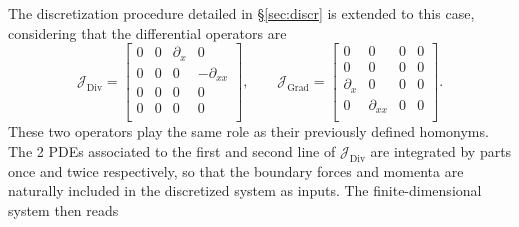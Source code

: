 \documentclass{svjour3}                     %
\newcommand{\secref}[1]{\S\ref{#1}}
\DeclareMathOperator*{\Grad}{Grad}
\DeclareMathOperator*{\Div}{Div}
\begin{document}
	The discretization procedure detailed in \secref{sec:discr} is extended to this case, considering that the differential operators are 
	\[
	\bm{\mathcal{J}}_{\Div} = \begin{bmatrix}
	0 & 0 & \partial_x & 0 \\
	0 & 0 & 0 & -\partial_{xx} \\
	0 & 0 & 0 & 0 \\
	0 & 0 & 0 & 0 \\
	\end{bmatrix}, \qquad 
	\bm{\mathcal{J}}_{\Grad} = \begin{bmatrix}
	0 & 0 & 0 & 0 \\
	0 & 0 & 0 & 0 \\
	\partial_x & 0 & 0 & 0 \\
	0 & \partial_{xx} & 0 & 0 \\
	\end{bmatrix}.
	\]
	These two operators play the same role as their previously defined homonyms. The 2 PDEs associated to the first and second line of $\bm{\mathcal{J}}_{\Div}$ are integrated by parts once and twice respectively, so that the boundary forces and momenta are naturally included in the discretized system as inputs. The finite-dimensional system then reads
\end{document}
